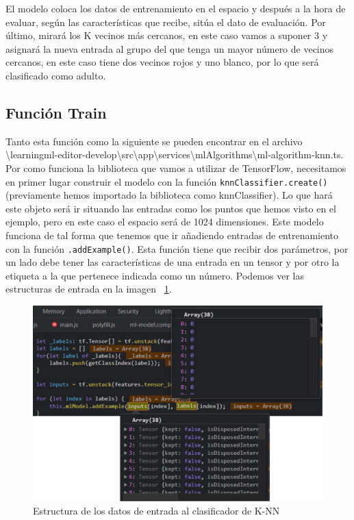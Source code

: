 \documentclass[a4paper, 12pt]{book}
\begin{document}
El modelo coloca los datos de entrenamiento en el espacio y después a la hora de evaluar, según las características que recibe, sitúa el dato de evaluación. Por último, mirará los K vecinos más cercanos, en este caso vamos a suponer 3 y asignará la nueva entrada al grupo del que tenga un mayor número de vecinos cercanos, en este caso tiene dos vecinos rojos y uno blanco, por lo que será clasificado como adulto.

\subsection{Función Train} 
\label{sec:funciontrainknn}

Tanto esta función como la siguiente se pueden encontrar en el archivo \textbackslash learningml-editor-develop\textbackslash src\textbackslash app\textbackslash services\textbackslash mlAlgorithms\textbackslash ml-algorithm-knn.ts.\\
Por como funciona la biblioteca que vamos a utilizar de TensorFlow, necesitamos en primer lugar construir el modelo con la función  \texttt{knnClassifier.create()} (previamente hemos importado la biblioteca como knnClassifier). Lo que hará este objeto será ir situando las entradas como los puntos que hemos visto en el ejemplo, pero en este caso el espacio será de 1024 dimensiones. Este modelo funciona de tal forma que tenemos que ir añadiendo entradas de entrenamiento con la función \texttt{.addExample()}. Esta función tiene que recibir dos parámetros, por un lado debe tener las características de una entrada en un tensor y por otro la etiqueta a la que pertenece indicada como un número. Podemos ver las estructuras de entrada en la imagen ~\ref{fig:entradasclasificadorknn}.

\begin{figure}
	\centering
	\includegraphics[width=12cm, keepaspectratio]{img/entradasclasificadorknn}
	\caption{Estructura de los datos de entrada al clasificador de K-NN}				
	\label{fig:entradasclasificadorknn}
\end{figure}
\end{document}
